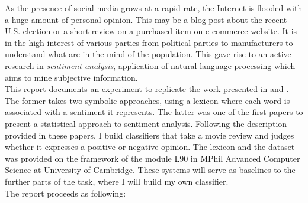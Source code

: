 As the presence of social media grows at a rapid rate, the Internet is flooded with a huge amount of personal opinion. This may be a blog post about the recent U.S. election or a short review on a purchased item on e-commerce website. It is in the high interest of various parties from political parties to manufacturers to understand what are in the mind of the population. This gave rise to an active research in {\em sentiment analysis}, application of natural language processing which aims to mine subjective information. \\
This report documents an experiment to replicate the work presented in \cite{wilson2005recognizing} and \cite{pang2002thumbs}. The former takes two symbolic approaches, using a lexicon where each word is associated with a sentiment it represents. The latter was one of the first papers to present a statistical approach to sentiment analysis. Following the description provided in these papers, I build classifiers that take a movie review and judges whether it expresses a positive or negative opinion. The lexicon and the dataset was provided on the framework of the module L90 in MPhil Advanced Computer Science at University of Cambridge. These systems will serve as baselines to the further parts of the task, where I will build my own classifier.\\
The report proceeds as following: %